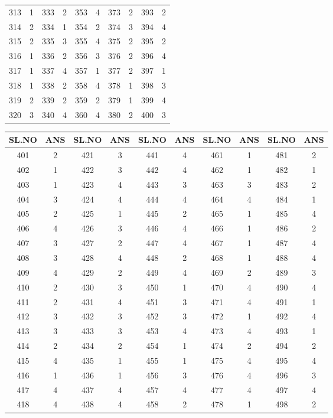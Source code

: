 {\begin{tabular}{|c|c||c|c||c|c||c|c||c|c|}
313 & 1 & 333 & 2 & 353 & 4 & 373 & 2 & 393 & 2 \\
314 & 2 & 334 & 1 & 354 & 2 & 374 & 3 & 394 & 4 \\
315 & 2 & 335 & 3 & 355 & 4 & 375 & 2 & 395 & 2 \\
316 & 1 & 336 & 2 & 356 & 3 & 376 & 2 & 396 & 4 \\
317 & 1 & 337 & 4 & 357 & 1 & 377 & 2 & 397 & 1 \\
318 & 1 & 338 & 2 & 358 & 4 & 378 & 1 & 398 & 3 \\
319 & 2 & 339 & 2 & 359 & 2 & 379 & 1 & 399 & 4 \\
320 & 3 & 340 & 4 & 360 & 4 & 380 & 2 & 400 & 3 \\
\hline
\end{tabular}\par\bigskip
\begin{tabular}{|c|c||c|c||c|c||c|c||c|c|}
\hline
SL.NO & ANS & SL.NO & ANS & SL.NO & ANS & SL.NO & ANS & SL.NO & ANS \\
\hline
401 & 2 & 421 & 3 & 441 & 4 & 461 & 1 & 481 & 2 \\
402 & 1 & 422 & 3 & 442 & 4 & 462 & 1 & 482 & 1 \\
403 & 1 & 423 & 4 & 443 & 3 & 463 & 3 & 483 & 2 \\
404 & 3 & 424 & 4 & 444 & 4 & 464 & 4 & 484 & 1 \\
405 & 2 & 425 & 1 & 445 & 2 & 465 & 1 & 485 & 4 \\
406 & 4 & 426 & 3 & 446 & 4 & 466 & 1 & 486 & 2 \\
407 & 3 & 427 & 2 & 447 & 4 & 467 & 1 & 487 & 4 \\
408 & 3 & 428 & 4 & 448 & 2 & 468 & 1 & 488 & 4 \\
409 & 4 & 429 & 2 & 449 & 4 & 469 & 2 & 489 & 3 \\
410 & 2 & 430 & 3 & 450 & 1 & 470 & 4 & 490 & 4 \\
411 & 2 & 431 & 4 & 451 & 3 & 471 & 4 & 491 & 1 \\
412 & 3 & 432 & 3 & 452 & 3 & 472 & 1 & 492 & 4 \\
413 & 3 & 433 & 3 & 453 & 4 & 473 & 4 & 493 & 1 \\
414 & 2 & 434 & 2 & 454 & 1 & 474 & 2 & 494 & 2 \\
415 & 4 & 435 & 1 & 455 & 1 & 475 & 4 & 495 & 4 \\
416 & 1 & 436 & 1 & 456 & 3 & 476 & 4 & 496 & 3 \\
417 & 4 & 437 & 4 & 457 & 4 & 477 & 4 & 497 & 4 \\
418 & 4 & 438 & 4 & 458 & 2 & 478 & 1 & 498 & 2 \\

\end{tabular}}
